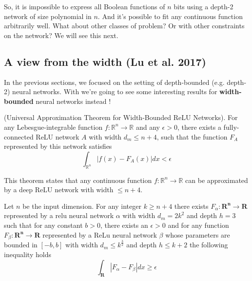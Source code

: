\documentclass{article}
\begin{document}
So, it is impossible to express all Boolean functions of $n$ bits using a depth-2 network of size polynomial in $n$. And it's possible to fit any continuous function arbitrarily well. What about other classes of problem? Or with other constraints on the network? We will see this next.


\vspace{5mm}


\subsection{A view from the width (Lu et al. 2017)}
In the previous sections, we focused on the setting of depth-bounded (e.g. depth-2) neural networks. With \cite{lu2017expressive} we're going to see some interesting results for \textbf{width-bounded} neural networks instead !

\begin{thm}
(Universal Approximation Theorem for Width-Bounded ReLU Networks).
For any Lebesgue-integrable function $f:\mathbb{R}^n \to \mathbb{R}$ and any $\epsilon > 0$, there exists a fully-connected ReLU network $A$ with width $d_m \leq n + 4$, such that the function $F_A$ represented by this network satisfies
$$\int_{\mathbb{R}^n} |f(x)-F_A(x)|dx < \epsilon$$
\end{thm}
This theorem states that any continuous function $f: \mathbb{R}^n \to \mathbb{R}$ can be approximated by a deep ReLU network with width $\leq n+4$.

\begin{thm}
    Let $n$ be the input dimension. For any integer $k \geq n+4$ there exists $F_{\alpha}: \mathbf{R^n} \rightarrow \mathbf{R}$ represented by a relu neural network $\alpha$ with width $d_m= 2k^2$ and depth $h=3$ such that for any constant $b>0$, there exists an $\epsilon>0$ and for any function $F_{\beta}: \mathbf{R^n} \rightarrow \mathbf{R}$ represented by a ReLu neural network $\beta$ whose parameters are bounded in $[-b,b]$ with width $d_m \leq k^{\frac{3}{2}}$ and depth $h \leq k+2$ the following inequality holds
    $$\int_{\mathbf{R}} |F_{\alpha} - F_{\beta}| dx \geq \epsilon$$
\end{thm}
\end{document}
